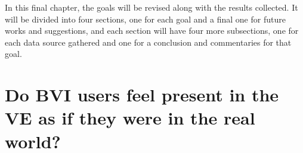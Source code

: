 



In this final chapter, the goals will be revised along with the results collected. It will be divided into four sections, one for each goal and a final one for future works and suggestions, and each section will have four more subsections, one for each data source gathered and one for a conclusion and commentaries for that goal.



\section{Do BVI users feel present in the VE as if they were in the real world?}

